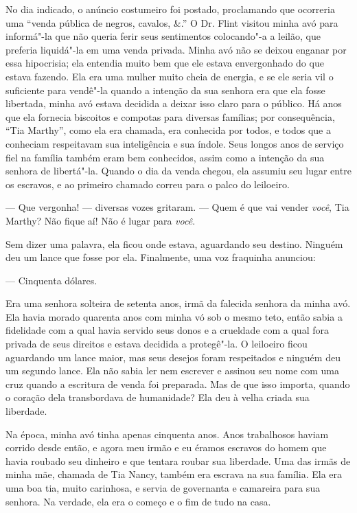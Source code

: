 No dia indicado, o anúncio costumeiro
foi postado, proclamando que ocorreria uma ``venda pública de negros,
cavalos, \&.'' O Dr. Flint visitou minha avó para informá"-la que não
queria ferir seus sentimentos colocando"-a a leilão, que preferia
liquidá"-la em uma venda privada. Minha avó não se deixou enganar por
essa hipocrisia; ela entendia muito bem que ele estava envergonhado do
que estava fazendo. Ela era uma mulher muito cheia de energia, e se ele
seria vil o suficiente para vendê"-la quando a intenção da sua senhora
era que ela fosse libertada, minha avó estava decidida a deixar isso
claro para o público. Há anos que ela fornecia biscoitos e compotas para
diversas famílias; por consequência, ``Tia Marthy'', como ela era
chamada, era conhecida por todos, e todos que a conheciam respeitavam
sua inteligência e sua índole. Seus longos anos de serviço fiel na
família também eram bem conhecidos, assim como a intenção da sua senhora
de libertá"-la. Quando o dia da venda chegou, ela assumiu seu lugar entre
os escravos, e ao primeiro chamado correu para o palco do leiloeiro.

--- Que vergonha! --- diversas vozes gritaram. --- Quem é que vai vender
\emph{você}, Tia Marthy? Não fique aí! Não é lugar para \emph{você}.

Sem dizer uma palavra, ela ficou onde estava, aguardando seu destino.
Ninguém deu um lance que fosse por ela. Finalmente, uma voz fraquinha
anunciou:

--- Cinquenta dólares.

Era uma senhora solteira de setenta anos, irmã da falecida senhora da
minha avó. Ela havia morado quarenta anos com minha vó sob o mesmo teto,
então sabia a fidelidade com a qual havia servido seus donos e a
crueldade com a qual fora privada de seus direitos e estava decidida a
protegê"-la. O leiloeiro ficou aguardando um lance maior, mas seus
desejos foram respeitados e ninguém deu um segundo lance. Ela não sabia
ler nem escrever e assinou seu nome com uma cruz quando a escritura de
venda foi preparada. Mas de que isso importa, quando o coração dela
transbordava de humanidade? Ela deu à velha criada sua liberdade.

Na época, minha avó tinha apenas
cinquenta anos. Anos trabalhosos haviam corrido desde então, e agora meu
irmão e eu éramos escravos do homem que havia roubado seu dinheiro e que
tentara roubar sua liberdade. Uma das irmãs de minha mãe, chamada de Tia
Nancy, também era escrava na sua família. Ela era uma boa tia, muito
carinhosa, e servia de governanta e camareira para sua senhora. Na
verdade, ela era o começo e o fim de tudo na casa.

